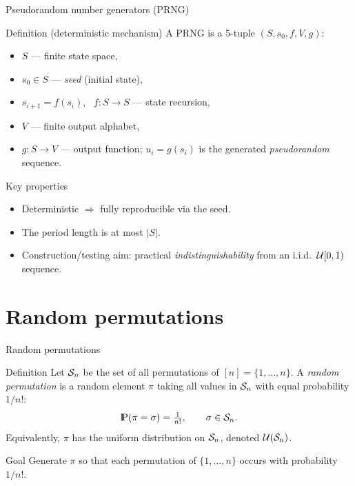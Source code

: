 \documentclass[aspectratio=169]{beamer}
\newcommand{\Prob}{{\rm I\hspace{-0.8mm}P}}
\begin{document}
\begin{frame}{Pseudorandom number generators (PRNG)}
\begin{block}{Definition (deterministic mechanism)}
A PRNG is a 5-tuple $(S,s_0,f,V,g)$:
\begin{itemize}
  \item $S$ — finite state space,
  \item $s_0\in S$ — \textsl{seed} (initial state),
  \item $s_{i+1}=f(s_i)$, \ $f:S\to S$ — state recursion,
  \item $V$ — finite output alphabet,
  \item $g:S\to V$ — output function; $u_i=g(s_i)$ is the generated \textsl{pseudorandom} sequence.
\end{itemize}
\end{block}

\smallskip
\begin{block}{Key properties}
\begin{itemize}
  \item Deterministic $\Rightarrow$ fully reproducible via the seed.
  \item The period length is at most $|S|$.
  \item Construction/testing aim: practical \emph{indistinguishability} from an i.i.d.\ ${\cal U}[0,1)$ sequence.
\end{itemize}
\end{block}
\end{frame}



\section{Random permutations}

\begin{frame}{Random permutations}
\begin{block}{Definition}
Let ${\cal S}_n$ be the set of all permutations of $[n]=\{1,\ldots,n\}$.
A \textsl{random permutation} is a random element $\pi$ taking all values in
${\cal S}_n$ with equal probability $1/n!$:
\[
  \Prob(\pi = \sigma) = \tfrac{1}{n!}, \qquad \sigma \in \calS_n.
\]
Equivalently, $\pi$ has the uniform distribution on ${\cal S}_n$, denoted
${\cal U}({\cal S}_n)$.
\end{block}

\begin{block}{Goal}
Generate $\pi$ so that each permutation of $\{1,\ldots,n\}$ occurs with probability $1/n!$.
\end{block}
\end{frame}
\end{document}

